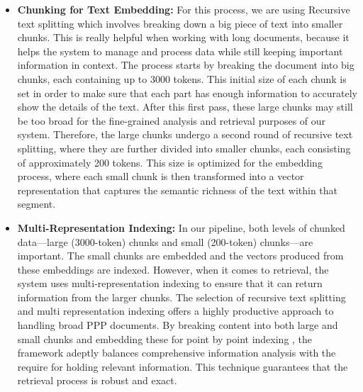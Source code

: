 \begin{itemize}
    \item \textbf{Chunking for Text Embedding:} For this process, we are using Recursive text splitting which involves breaking down a big piece of text into smaller chunks. This is really helpful when working with long documents, because it helps the system to manage and process data while still keeping important information in context.%
    \vskip 0.5cm
    The process starts by breaking the document into big chunks, each containing up to 3000 tokens. This initial size of each chunk is set in order to make sure that each part has enough information to accurately show the details of the text.
    \vskip 0.5cm
    After this first pass, these large chunks may still be too broad for the fine-grained analysis and retrieval purposes of our system. Therefore, the large chunks undergo a second round of recursive text splitting, where they are further divided into smaller chunks, each consisting of approximately 200 tokens. This size is optimized for the embedding process, where each small chunk is then transformed into a vector representation that captures the semantic richness of the text within that segment.
    \item \textbf{Multi-Representation Indexing:} In our pipeline, both levels of chunked data—large (3000-token) chunks and small (200-token) chunks—are important. The small chunks are embedded and the vectors produced from these embeddings are indexed. However, when it comes to retrieval, the system uses multi-representation indexing to ensure that it can return information from the larger chunks.
    \vskip 0.5cm
    The selection of recursive text splitting and multi representation indexing offers a highly productive approach to handling broad PPP documents. By breaking content into both large and small chunks and embedding these for point by point indexing , the framework adeptly balances comprehensive information analysis with the require for holding relevant information. This technique guarantees that the retrieval process is robust and exact.
\end{itemize}





